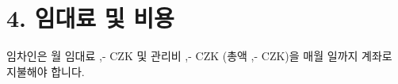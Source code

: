 \section*{4. 임대료 및 비용}
임차인은 월 임대료 \Rentrentamount,- CZK 및 관리비 \Rentservicesamount,- CZK (총액 \Renttotalamount,- CZK)을 매월 \Rentpaymentday 일까지 \Rentbankaccount 계좌로 지불해야 합니다.
